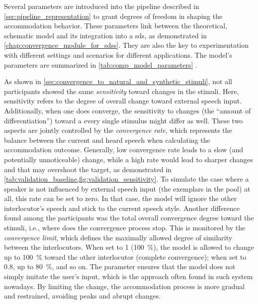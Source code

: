 Several parameters are introduced into the pipeline described in \cref{sec:pipeline_representation} to grant degrees of freedom in shaping the accommodation behavior.
These parameters link between the theoretical, schematic model and its integration into a \ac{sds}, as demonstrated in \cref{chap:convergence_module_for_sdss}.
They are also the key to experimentation with different settings and scenarios for different applications.
The model's parameters are summarized in \cref{tab:comp_model_parameters} \citep[and cf.\ ][]{Raveh2017Interspeech}.

As shown in \cref{sec:convergence_to_natural_and_synthetic_stimuli}, not all participants showed the same \emph{sensitivity} toward changes in the stimuli.
Here, sensitivity refers to the degree of overall change toward external speech input.
Additionally, when one does converge, the sensitivity to changes (the \enquote{amount of differentiation}) toward a every single stimulus might differ as well.
These two aspects are jointly controlled by the \emph{convergence rate}, which represents the balance between the current and heard speech when calculating the accommodation outcome.
Generally, low convergence rate leads to a slow (and potentially unnoticeable) change, while a high rate would lead to sharper changes and that may overshoot the target, as demonstrated in \cref{tab:validation_baseline,fig:validation_sensitivity}.
To simulate the case where a speaker is not influenced by external speech input (the exemplars in the pool) at all, this rate can be set to zero.
In that case, the model will ignore the other interlocutor's speech and stick to the current speech style.
Another difference found among the participants was the total overall convergence degree toward the stimuli, i.e., where does the convergence process stop.
This is monitored by the \emph{convergence limit}, which defines the maximally allowed degree of similarity between the interlocutors.
When set to 1 (\SI{100}{\percent}), the model is allowed to change up to \SI{100}{\percent} toward the other interlocutor (complete convergence); when set to 0.8, up to \SI{80}{\percent}, and so on.
The parameter ensures that the model does not simply imitate the user's input, which is the approach often found in such system nowadays.
By limiting the change, the accommodation process is more gradual and restrained, avoiding peaks and abrupt changes.

